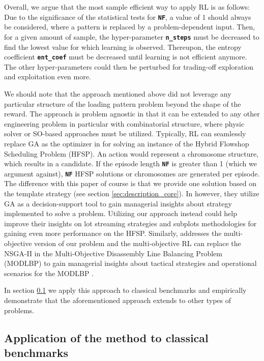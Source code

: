 \documentclass[a4paper]{article}
\newcommand{\code}[1]{\colorbox{light-gray}{\small\color{blue}\textbf{\texttt{#1}}}}
\begin{document}
Overall, we argue that the most sample efficient way to apply RL is as follows: Due to the significance of the statistical tests for \code{NF}, a value of 1 should always be considered, where a pattern is replaced by a problem-dependent input. Then, for a given amount of sample, the hyper-parameter \code{n\_steps} must be decreased to find the lowest value for which learning is observed. Thereupon, the entropy coefficient \code{ent\_coef} must be decreased until learning is not efficient anymore. The other hyper-parameters could then be perturbed for trading-off exploration and exploitation even more. 

We should note that the approach mentioned above did not leverage any particular structure of the loading pattern problem beyond the shape of the reward. The approach is problem agnostic in that it can be extended to any other engineering problem in particular with combinatorial structure, where physic solver or SO-based approaches must be utilized.  Typically, RL can seamlessly replace GA as the optimizer in \cite{yilmaz2022lot} for solving an instance of the Hybrid Flowshop Scheduling Problem (HFSP). An action would represent a chromosome structure, which results in a candidate. If the episode length \code{NF} is greater than 1 (which we argument against), \code{NF} HFSP solutions or chromosomes are generated per episode. The difference with this paper of course is that we provide one solution based on the template strategy (see section \ref{sec:description_core}). In \cite{yilmaz2022lot} however, they utilize GA as a decision-support tool to gain managerial insights about strategy implemented to solve a problem. Utilizing our approach instead could help improve their insights on lot streaming strategies and subplots methodologies for gaining even more performance on the HFSP. Similarly, \cite{seurin2023pareto} addresses the multi-objective version of our problem and the multi-objective RL can replace the NSGA-II in the Multi-Objective Disassembly Line Balancing Problem (MODLBP) \cite{yilmaz2022tactical} to gain managerial insights about tactical strategies and operational scenarios for the MODLBP \cite{yilmaz2022tactical}.

In section \ref{sec:applicationtobenchmark} we apply this approach to classical benchmarks and empirically demonstrate that the aforementioned approach extends to other types of problems.

\subsection{Application of the method to classical benchmarks}
\label{sec:applicationtobenchmark}
\end{document}
